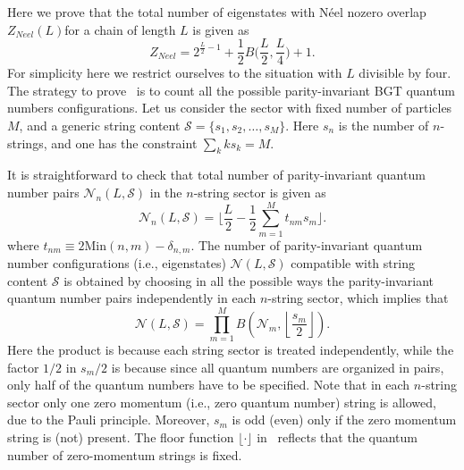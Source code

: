 \documentclass[11pt]{iopart}
\begin{document}
Here we prove that the total number of eigenstates with N\'eel nozero overlap 
$Z_{Neel}(L)$for a chain of length $L$ is given as 
%
\begin{equation}
\label{N-count}
Z_{Neel}=2^{\frac{L}{2}-1}+\frac{1}{2}B\Big(\frac{L}{2},\frac{L}{4}\Big)+1. 
\end{equation}
%
For simplicity here we restrict ourselves to the situation with $L$ divisible by 
four. The strategy to prove~ is to count all the possible parity-invariant 
BGT quantum numbers configurations. Let us consider the sector with fixed number of 
particles $M$, and a generic string content ${\mathcal S}=\{s_1,s_2,\dots,s_{M}\}$. 
Here $s_n$ is the number of $n$-strings, and one has the constraint $\sum_k ks_k=M$. 

It is straightforward to check that total number of parity-invariant quantum number 
pairs ${\mathcal N}_n(L,{\mathcal S})$ in the $n$-string sector is given as 
%
\begin{equation}
\label{NnLS}
{\mathcal N}_n(L,{\mathcal S})=\Big\lfloor\frac{L}{2}-\frac{1}{2}
\sum_{m=1}^{M}t_{nm}s_m\Big\rfloor.
\end{equation}
%
where $t_{nm}\equiv 2\textrm{Min}(n,m)-\delta_{n,m}$. The number of parity-invariant 
quantum number configurations (i.e., eigenstates) ${\mathcal N}(L,{\mathcal S})$ 
compatible with string content ${\mathcal S}$ is obtained by choosing in all the 
possible ways the parity-invariant quantum number pairs independently in each 
$n$-string sector, which implies that    
%
\begin{equation}
\label{NLS}
{\mathcal N}(L,{\mathcal S})=\prod_{m=1}^{M} B\left({\mathcal N}_m,\left\lfloor
\frac{s_m}{2}\right\rfloor\right).
\end{equation}
%
Here the product is because each string sector is treated independently, while the 
factor $1/2$ in $s_m/2$ is because since all quantum numbers are organized in pairs, 
only half of the quantum numbers have to be specified. Note that in each $n$-string 
sector only one zero momentum (i.e., zero quantum number) string is allowed, due to 
the Pauli principle. Moreover, $s_m$ is odd (even) only if the zero momentum string 
is (not) present. The floor function $\lfloor\cdot\rfloor$ in~ reflects 
that the quantum number of zero-momentum strings is fixed. 
\end{document}
